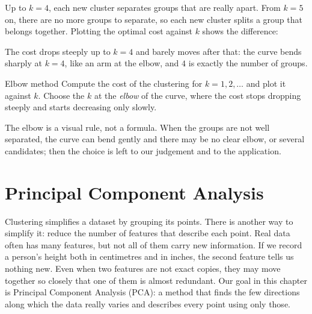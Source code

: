 \documentclass[a4paper,12pt,oneside]{report}
\begin{document}
Up to $k=4$, each new cluster separates groups that are really apart.
From $k=5$ on, there are no more groups to separate, so each new
cluster splits a group that belongs together. Plotting the optimal
cost against $k$ shows the difference:
\begin{center}
\end{center}
The cost drops steeply up to $k=4$ and barely moves after that: the
curve bends sharply at $k=4$, like an arm at the elbow, and $4$
is exactly the number of groups.

\begin{frameddefn}{Elbow method}
\label{def:elbow-method}
Compute the cost of the clustering for $k=1,2,\ldots$ and plot it
against $k$. Choose the $k$ at the \emph{elbow} of the curve, where the
cost stops dropping steeply and starts decreasing only slowly.
\end{frameddefn}

The elbow is a visual rule, not a formula. When the groups are not
well separated, the curve can bend gently and there may be no clear
elbow, or several candidates; then the choice is left to our judgement
and to the application.

\endgroup

\chapter{Principal Component Analysis}
\label{ch:matrices-projections}

\begingroup
{}

Clustering simplifies a dataset by grouping its points. There is
another way to simplify it: reduce the number of features that
describe each point. Real data often has many features, but not all
of them carry new information. If we record a person's height both in
centimetres and in inches, the second feature tells us nothing new.
Even when two features are not exact copies, they may move together
so closely that one of them is almost redundant. Our goal in this
chapter is Principal Component Analysis (PCA): a method that finds
the few directions along which the data really varies and describes
every point using only those.
\end{document}
